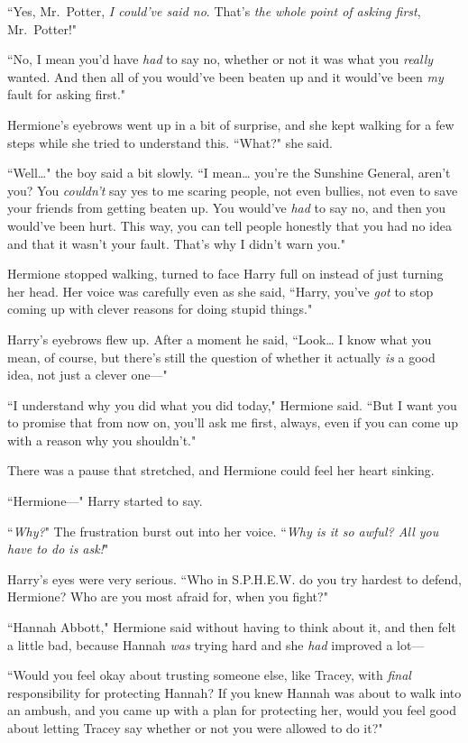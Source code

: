 ``Yes, Mr.~Potter, \emph{I could've said no}. That's \emph{the whole point of asking first}, Mr.~Potter!"

``No, I mean you'd have \emph{had} to say no, whether or not it was what you \emph{really} wanted. And then all of you would've been beaten up and it would've been \emph{my} fault for asking first."

Hermione's eyebrows went up in a bit of surprise, and she kept walking for a few steps while she tried to understand this. ``What?" she said.

``Well{\ldots}" the boy said a bit slowly. ``I mean{\ldots} you're the Sunshine General, aren't you? You \emph{couldn't} say yes to me scaring people, not even bullies, not even to save your friends from getting beaten up. You would've \emph{had} to say no, and then you would've been hurt. This way, you can tell people honestly that you had no idea and that it wasn't your fault. That's why I didn't warn you."

Hermione stopped walking, turned to face Harry full on instead of just turning her head. Her voice was carefully even as she said, ``Harry, you've \emph{got} to stop coming up with clever reasons for doing stupid things."

Harry's eyebrows flew up. After a moment he said, ``Look{\ldots} I know what you mean, of course, but there's still the question of whether it actually \emph{is} a good idea, not just a clever one—"

``I understand why you did what you did today," Hermione said. ``But I want you to promise that from now on, you'll ask me first, always, even if you can come up with a reason why you shouldn't."

There was a pause that stretched, and Hermione could feel her heart sinking.

``Hermione—" Harry started to say.

``\emph{Why?}" The frustration burst out into her voice. ``\emph{Why is it so awful? All you have to do is ask!}"

Harry's eyes were very serious. ``Who in S.P.H.E.W. do you try hardest to defend, Hermione? Who are you most afraid for, when you fight?"

``Hannah Abbott," Hermione said without having to think about it, and then felt a little bad, because Hannah \emph{was} trying hard and she \emph{had} improved a lot—

``Would you feel okay about trusting someone else, like Tracey, with \emph{final} responsibility for protecting Hannah? If you knew Hannah was about to walk into an ambush, and you came up with a plan for protecting her, would you feel good about letting Tracey say whether or not you were allowed to do it?"

